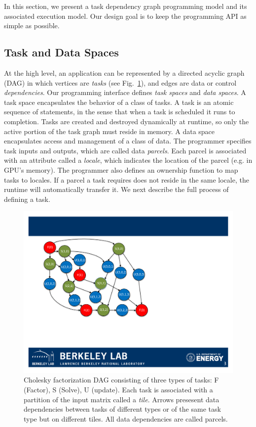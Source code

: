 In this section, we present a task dependency graph programming model and its associated execution model.
Our design goal is to keep the programming API as simple as possible.


\subsection{Task and Data Spaces}
At the high level, an application can be represented by a directed acyclic graph (DAG) in which vertices are {\em tasks} (see Fig.~\ref{fig:cholesky}),
and edges are data or control {\em dependencies}.
Our programming interface defines {\em task spaces} and {\em data spaces}.
A task space encapsulates the behavior of a class of tasks.
A task is an atomic sequence of statements, in the sense that when a task is scheduled it runs to completion.
Tasks are created and destroyed dynamically at runtime, so only the active portion of the task graph must reside in memory.
A data space encapsulates access and management of a class of data.
The programmer specifies task inputs and outputs, which are called data {\em parcels}.
Each parcel is associated with an attribute called a {\em locale}, which indicates the location of the parcel (e.g. in GPU's memory).
The programmer also defines an ownership function to map tasks to locales.
If a parcel a task requires does not reside in the same locale, the runtime will automatically transfer it.
We next describe the full process of defining a task.

\begin{figure}[htb]
\centering
\includegraphics[width=.6\textwidth]{figures/cholesky.pdf}
\caption{Cholesky factorization DAG consisting of three types of tasks: F (Factor), S (Solve), U (update). Each task is associated with a partition of the input matrix called a {\em tile}. Arrows presesent data dependencies between tasks of different types or of the same task type but on different tiles. All data dependencies are called parcels.}
\label{fig:cholesky}
\end{figure}



